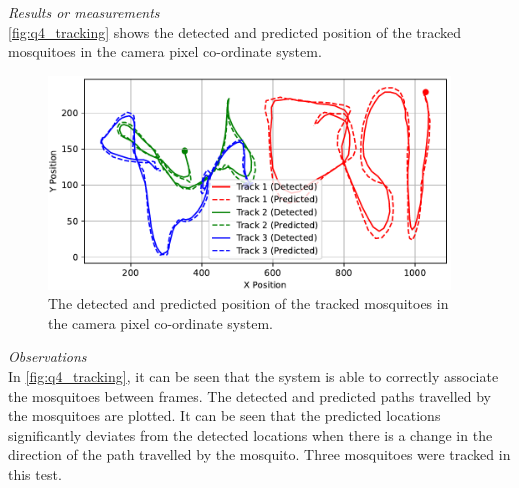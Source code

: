\textit{Results or measurements}\\
\autoref{fig:q4_tracking} shows the detected and predicted position of the tracked mosquitoes in the camera pixel co-ordinate system.
\begin{figure}[!htb]
  \centering
  \includegraphics[width=0.95\textwidth]{figures/results/tracking.pdf}
  \caption{The detected and predicted position of the tracked mosquitoes in the camera pixel co-ordinate system.}
  \label{fig:q4_tracking}
\end{figure}

\textit{Observations}\\
In \autoref{fig:q4_tracking}, it can be seen that the system is able to correctly associate the mosquitoes between frames. The detected and predicted paths travelled by the mosquitoes are plotted. It can be seen that the predicted locations significantly deviates from the detected locations when there is a change in the direction of the path travelled by the mosquito. Three mosquitoes were tracked in this test.

\newpage



